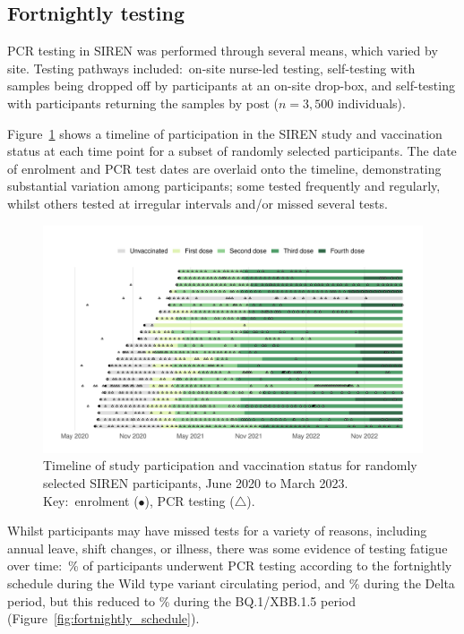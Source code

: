 \subsection{Fortnightly testing}\label{sec:fortnightly-testing}

PCR testing in SIREN was performed through several means, which varied by site. Testing pathways included:\ on-site nurse-led testing, self-testing with samples being dropped off by participants at an on-site drop-box, and self-testing with participants returning the samples by post ($n=3,500$ individuals).

Figure~\ref{fig:siren_timeline} shows a timeline of participation in the SIREN study and vaccination status at each time point for a subset of randomly selected participants. The date of enrolment and PCR test dates are overlaid onto the timeline, demonstrating substantial variation among participants; some tested frequently and regularly, whilst others tested at irregular intervals and/or missed several tests.

\begin{figure}[htbp!]
    \centering
    \includegraphics[width=\textwidth]{siren_timeline.pdf}
    \caption[Timeline of study participation and vaccination status for randomly selected SIREN participants, June 2020 to March 2023]{Timeline of study participation and vaccination status for randomly selected SIREN participants, June 2020 to March 2023. Key:\ enrolment ($\bullet$), PCR testing ($\triangle$).}\label{fig:siren_timeline}
\end{figure}

Whilst participants may have missed tests for a variety of reasons, including annual leave, shift changes, or illness, there was some evidence of testing fatigue over time:\ \% of participants underwent PCR testing according to the fortnightly schedule during the Wild type variant circulating period, and \% during the Delta period, but this reduced to \% during the BQ.1/XBB.1.5 period (Figure~\ref{fig:fortnightly_schedule}).

